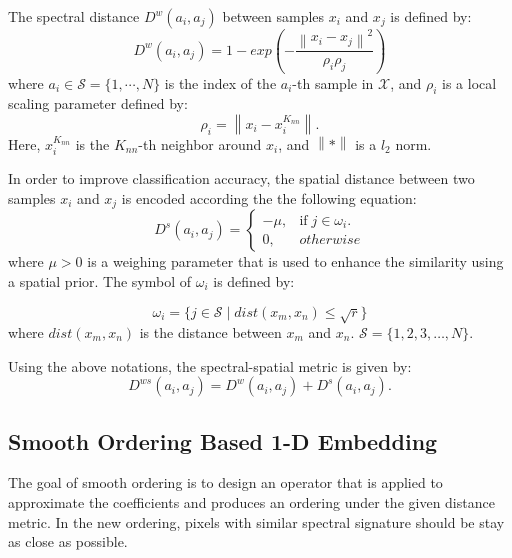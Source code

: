 \documentclass{ws-ijwmip}
\begin{document}
The spectral distance $D^w(a_i, a_j)$ between samples $x_i$ and $x_j$ is defined by:
\begin{equation}
D^w(a_i, a_j) = 1 - exp(-\frac{\left \| x_i - x_j \right \|^2}{\rho _i\rho _j})
\label{equ2.6}
\end{equation}
where $a_i\in \mathcal{S}=\{1,\cdots, N\}$ is the index of the $a_i$-th sample in $\mathcal{X}$, and 
$\rho_i$ is a local scaling parameter defined by:
\begin{equation}
\rho _i = \left \| x_i-x_i^{K_{nn}} \right \|.
\label{equ2.7}
\end{equation}
Here,  $x_i^{K_{nn}}$ is the $K_{nn}$-th neighbor around $x_i$, and $\left \| * \right \|$ is a $l_2$ norm.

In order to improve classification accuracy, the spatial distance between two samples $x_i$ and $x_j$ is encoded according the the following equation:
\begin{equation}
D^s(a_i,a_j) =\left\{\begin{matrix}
-\mu, & \mbox{if} \;j \in {\omega_i}.\\
0,  & otherwise
\end{matrix}\right.
\label{equ2.8}
\end{equation}
where $\mu > 0$ is a weighing parameter that is used to enhance the similarity using a spatial prior. The symbol of $\omega_i$ is defined by:

\begin{equation}
\omega _i = \{j\in \mathcal{S} \mid dist(x_m, x_n) \leqslant \sqrt{r}\}
\label{equ2.9}
\end{equation}
where $dist(x_m, x_n)$ is the distance between $x_m$ and $x_n$. $\mathcal{S} = \{1,2,3,\dots,N\}$.

Using the above notations, the spectral-spatial metric is given by:
\begin{equation}
D^{ws}(a_i, a_j) = D^w(a_i, a_j) + D^s(a_i, a_j).
\label{equ2.10}
\end{equation}


\subsection{Smooth Ordering Based 1-D Embedding}

The goal of smooth ordering is to design an operator that is applied to approximate the coefficients and produces an ordering under the given distance metric. 
In the new ordering, pixels with similar spectral signature should be stay as close as possible.
\end{document}
